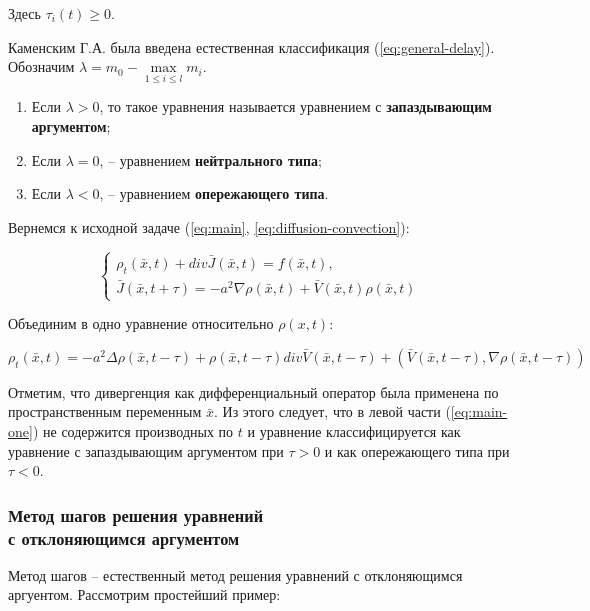 Здесь $\tau_i(t) \geq 0$.

Каменским Г.А. была введена естественная классификация (\ref{eq:general-delay}). Обозначим $\lambda = m_0 - \max\limits_{1 \leq i \leq l} m_i$.

\begin{enumerate}
\item Если $\lambda > 0$, то такое уравнения называется уравнением с \textbf{запаздывающим аргументом};
\item Если $\lambda = 0$, \--- уравнением \textbf{нейтрального типа};
\item Если $\lambda < 0$, \--- уравнением \textbf{опережающего типа}.
\end{enumerate}

Вернемся к исходной задаче (\ref{eq:main}, \ref{eq:diffusion-convection}):

\begin{equation}
\left\{
\begin{aligned}
\rho_t(\bar{x},t) + div \bar{J}(\bar{x},t) = f(\bar{x},t),\\
\bar{J}(\bar{x},t+\tau) = -a^2 \nabla \rho(\bar{x},t) + \bar{V}(\bar{x},t) \rho(\bar{x},t)
\end{aligned}
\right.
\end{equation}

Объединим в одно уравнение относительно $\rho(x,t)$:

\begin{equation}\label{eq:main-one}
\rho_t(\bar{x},t) = -a^2 \Delta \rho(\bar{x},t-\tau) + \rho(\bar{x},t-\tau) div \bar{V}(\bar{x},t-\tau) + (\bar{V}(\bar{x},t-\tau),\nabla \rho(\bar{x},t-\tau))
\end{equation}

Отметим, что дивергенция как дифференциальный оператор была применена по пространственным переменным $\bar{x}$. Из этого следует, что в левой части (\ref{eq:main-one}) не содержится производных по $t$ и уравнение классифицируется как уравнение с запаздывающим аргументом при $\tau>0$ и как опережающего типа при $\tau<0$.

\subsubsection{Метод шагов решения уравнений\\с отклоняющимся аргументом}

Метод шагов \--- естественный метод решения уравнений с отклоняющимся аргуентом. Рассмотрим простейший пример:

